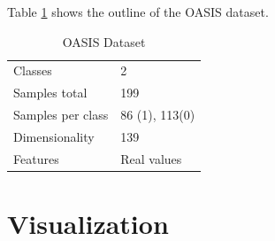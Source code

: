Table \ref{tab:dataset} shows the outline of the OASIS dataset.

\begin{table}
	\caption{OASIS Dataset}
	\label{tab:dataset}
	\centering
	\begin{tabular}{lp{4cm}}
		\hline 
		Classes & 2\\
		Samples total & 199 \\
		Samples per class & 86 (1), 113(0) \\
		Dimensionality & 139 \\
		Features & Real values \\ \hline
	\end{tabular}
\end{table}


%
%
%

%
%

\section{Visualization}

